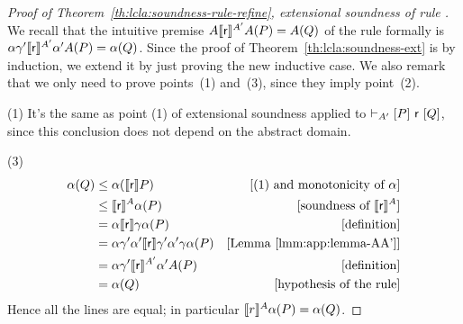 \begin{proof}[Proof of Theorem~\ref{th:lcla:soundness-rule-refine}, extensional soundness of rule ]
	We recall that the intuitive premise $A \llbracket\mathsf{r}\rrbracket^{A'} A(P) = A(Q)$ of the rule formally is $\alpha \gamma' \llbracket\mathsf{r}\rrbracket^{A'} \alpha' A(P) = \alpha(Q)$.
	Since the proof of Theorem~\ref{th:lcla:soundness-ext} is by induction, we extend it by just proving the new inductive case. We also remark that we only need to prove points~(1) and~(3), since they imply point~(2).

	\noindent (1) It's the same as point (1) of extensional soundness applied to $\vdash_{A'}\nobreak[P]~\mathsf{r}~[Q]$, since this conclusion does not depend on the abstract domain.

	\noindent (3)
	\begin{align*}
		\alpha(Q) & \le \alpha(\llbracket\mathsf{r}\rrbracket P)                                             & [\text{(1) and monotonicity of }\alpha]  \\
		          & \le \llbracket\mathsf{r}\rrbracket^{A} \alpha(P)                                         & [\text{soundness of } \llbracket\mathsf{r}\rrbracket^{A}] \\
		          & = \alpha \llbracket\mathsf{r}\rrbracket \gamma \alpha(P)                                 & [\text{definition}]                      \\
		          & = \alpha \gamma' \alpha' \llbracket\mathsf{r}\rrbracket \gamma' \alpha' \gamma \alpha(P) & [\text{Lemma~\ref{lmm:app:lemma-AA'}}]   \\
		          & = \alpha \gamma' \llbracket\mathsf{r}\rrbracket^{A'} \alpha' A(P)                        & [\text{definition}]                      \\
		          & = \alpha(Q)                                                             & [\text{hypothesis of the rule}]
	\end{align*}
	Hence all the lines are equal; in particular $\llbracket r\rrbracket^{A} \alpha(P) = \alpha(Q)$.
\end{proof}

